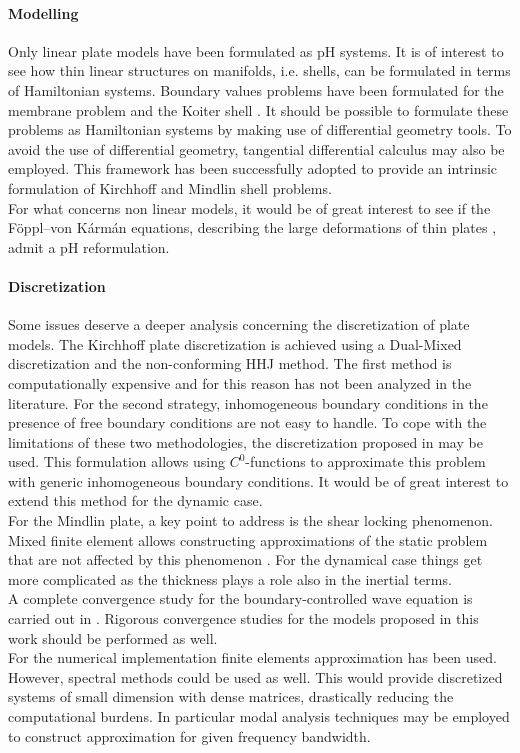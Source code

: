 \paragraph{Modelling}
Only linear plate models have been formulated as pH systems. It is of interest to see how thin linear structures on manifolds, i.e. shells, can be formulated in terms of Hamiltonian systems. Boundary values problems have been formulated for the membrane problem and the Koiter shell \cite{ciarlet2000shells}. It should be possible to formulate these problems as Hamiltonian systems by making use of differential geometry tools. To avoid the use of differential geometry, tangential differential calculus \cite{delfour2011shapes} may also be employed. This framework has been successfully adopted to provide an intrinsic formulation of Kirchhoff \cite{schollhammer2019kirchhoff} and Mindlin \cite{schollhammer2019reissner} shell problems. \\
For what concerns non linear models, it would be of great interest to see if the F\"oppl–von K\'arm\'an equations, describing the large deformations of thin plates \cite{bilbao2015conservative}, admit a pH reformulation. \\


\paragraph{Discretization}
Some issues deserve a deeper analysis concerning the discretization of plate models. The Kirchhoff plate discretization is achieved using a Dual-Mixed discretization and the non-conforming HHJ method. The first method is computationally expensive and for this reason has not been analyzed in the literature. For the second strategy, inhomogeneous boundary conditions in the presence of free boundary conditions are not easy to handle. To cope with the limitations of these two methodologies, the discretization proposed in \cite{rafetseder2018siam} may be used.  This formulation allows using $C^0$-functions to approximate this problem with generic inhomogeneous boundary conditions. It would be of great interest to extend this method for the dynamic case. \\ For the Mindlin plate, a key point to address is the shear locking phenomenon. Mixed finite element allows constructing approximations of the static problem that are not affected by this phenomenon \cite{veiga2013}. For the dynamical case things get more complicated as the thickness plays a role also in the inertial terms. \\ A complete convergence study for the boundary-controlled wave equation is carried out in \cite{haine2020numerical}. Rigorous convergence studies for the models proposed in this work should be performed as well. \\ For the numerical implementation finite elements approximation has been used. However, spectral methods could be used as well. This would provide discretized systems of small dimension with dense matrices, drastically reducing the computational burdens. In particular modal analysis techniques may be employed to construct approximation for given frequency bandwidth.

